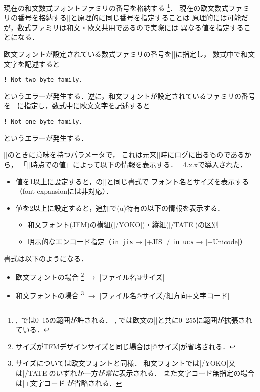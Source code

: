 \documentclass[a4paper,11pt,nomag,dvipdfmx]{jsarticle}
\begin{document}
\begin{cslist}
\csitem[\.{jfam}=<number>]
  現在の和文数式フォントファミリの番号を格納する
  \footnote{\pTeX,~\upTeX では0--15の範囲が許される．
  \epTeX, \eupTeX では欧文の|\fam|と共に0--255に範囲が拡張されている．}．
  現在の欧文数式ファミリの番号を格納する|\fam|と原理的に同じ番号を指定することは
  原理的には可能だが，数式ファミリは和文・欧文共用であるので実際には
  異なる値を指定することになる．

  欧文フォントが設定されている数式ファミリの番号を|\jfam|に指定し，
  数式中で和文文字を記述すると
\begin{verbatim}
! Not two-byte family.
\end{verbatim}
  というエラーが発生する．逆に，和文フォントが設定されているファミリの番号を
  |\fam|に指定し，数式中に欧文文字を記述すると
\begin{verbatim}
! Not one-byte family.
\end{verbatim}
  というエラーが発生する．

\ifx\ptextracingfonts\undefined\else
%
  ||のときに意味を持つパラメータで，
  これは元来|\shipout|時にログに出るものであるから，
  「|\shipout|時点での値」によって以下の情報を表示する．
  \pTeX~4.x.xで導入された．
 \begin{itemize}
  \item 値を1以上に設定すると，\pdfTeX の|\pdftracingfonts|と同じ書式で
   フォント名とサイズを表示する（font expansionには非対応）．
  \item 値を2以上に設定すると，追加で(u)\pTeX 特有の以下の情報を表示する．
   \begin{itemize}
    \item 和文フォント(JFM)の横組(|/YOKO|)・縦組(|/TATE|)の区別
    \item 明示的なエンコード指定（\verb+in jis+ → |+JIS| / \verb+in ucs+ → |+Unicode|）
   \end{itemize}
 \end{itemize}
  書式は以下のようになる．
 \begin{itemize}
  \item 欧文フォントの場合
    \footnote{サイズがTFMデザインサイズと同じ場合は|@サイズ|が省略される．}
    $\rightarrow$ |ファイル名@サイズ|
  \item 和文フォントの場合
    \footnote{サイズについては欧文フォントと同様．
      和文フォントでは|/YOKO|又は|/TATE|のいずれか一方が\emph{常に}表示される．
      また文字コード無指定の場合は|+文字コード|が省略される．}
    $\rightarrow$ |ファイル名@サイズ/組方向+文字コード|
 \end{itemize}
%
\fi


\end{cslist}
\end{document}
